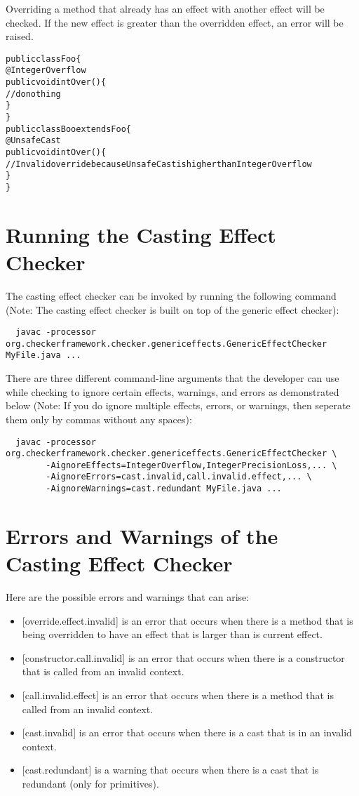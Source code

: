 Overriding a method that already has an effect with another effect will be checked. If the new effect is greater than the overridden effect, an error will be raised.

\begin{alltt}
public class Foo \{
    @IntegerOverflow
    public void intOver() \{
        //do nothing
    \}
\}
public class Boo extends Foo \{
    @UnsafeCast
    public void intOver() \{
        //Invalid override because UnsafeCast is higher than IntegerOverflow
    \}
\}
\end{alltt}

\section{Running the Casting Effect Checker\label{castingeffect-running}}

The casting effect checker can be invoked by running the following command (Note: The casting effect checker is built on top of the generic effect checker):
\begin{Verbatim}
  javac -processor org.checkerframework.checker.genericeffects.GenericEffectChecker MyFile.java ...
\end{Verbatim}

There are three different command-line arguments that the developer can use while checking to ignore certain effects, warnings, and errors as demonstrated below (Note: If you do ignore multiple effects, errors, or warnings, then seperate them only by commas without any spaces):
\begin{Verbatim}
  javac -processor org.checkerframework.checker.genericeffects.GenericEffectChecker \
        -AignoreEffects=IntegerOverflow,IntegerPrecisionLoss,... \
        -AignoreErrors=cast.invalid,call.invalid.effect,... \
        -AignoreWarnings=cast.redundant MyFile.java ...
\end{Verbatim}

\section{Errors and Warnings of the Casting Effect Checker\label{castingeffect-errors}}

Here are the possible errors and warnings that can arise:
\begin{itemize}
\item
{[override.effect.invalid]} is an error that occurs when there is a method that is being overridden to have an effect that is larger than is current effect.
\item
{[constructor.call.invalid]} is an error that occurs when there is a constructor that is called from an invalid context.
\item
{[call.invalid.effect]} is an error that occurs when there is a method that is called from an invalid context.
\item
{[cast.invalid]} is an error that occurs when there is a cast that is in an invalid context.
\item
{[cast.redundant]} is a warning that occurs when there is a cast that is redundant (only for primitives).
\end{itemize}
